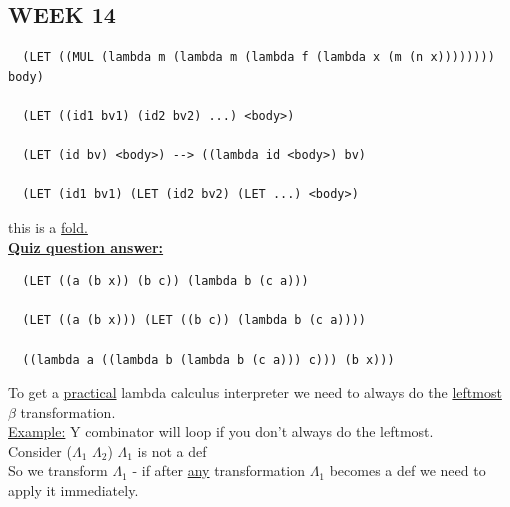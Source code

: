 \documentclass{article}
\begin{document}
\bigskip
\begin{flushleft}
 \section*{WEEK 14}
\begin{flushleft}
 \begin{verbatim}
  (LET ((MUL (lambda m (lambda m (lambda f (lambda x (m (n x)))))))) body)
  
  (LET ((id1 bv1) (id2 bv2) ...) <body>)
  
  (LET (id bv) <body>) --> ((lambda id <body>) bv)
  
  (LET (id1 bv1) (LET (id2 bv2) (LET ...) <body>)
 \end{verbatim}
 this is a \underline{fold.}\\
 \pagebreak
 \underline{\textbf{Quiz question answer:}}\\
 \begin{verbatim}
  (LET ((a (b x)) (b c)) (lambda b (c a)))
  
  (LET ((a (b x))) (LET ((b c)) (lambda b (c a))))
  
  ((lambda a ((lambda b (lambda b (c a))) c))) (b x)))
 \end{verbatim}
 \bigskip
 To get a \underline{practical} lambda calculus interpreter we need to always do the \underline{leftmost} $\beta$ transformation.\\
 \underline{Example:} Y combinator will loop if you don't always do the leftmost.\\
 \bigskip
 Consider ($\Lambda_1$ $\Lambda_2$) $\Lambda_1$ is not a def \\
 So we transform $\Lambda_1$ - if after \underline{any} transformation $\Lambda_1$ becomes a def we need to apply it immediately.
\end{flushleft}


\end{flushleft}
\end{document}
